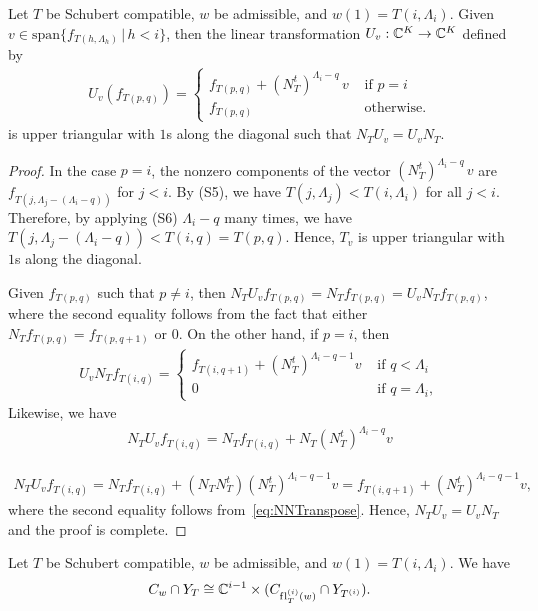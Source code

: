 \documentclass[12pt]{amsart}
\newcommand{\st}{\,|\,}
\newcommand{\vspan}{\mathrm{span}}
\newcommand{\fl}{\mathrm{f\hspace{0.25pt}l}}
\begin{document}
\begin{lemma}\label{lem:InvertibleTransf}
Let $T$ be Schubert compatible, $w$ be admissible, and $w(1) = T(i,\Lambda_i)$. Given $v\in \vspan\{f_{T(h,\Lambda_h)}\st h<i\}$, then the linear transformation $U_v: \mathbb{C}^K\to \mathbb{C}^K$ defined by
\begin{align}
    U_v(f_{T(p,q)}) = \begin{cases} f_{T(p,q)} + (N^t_T)^{\Lambda_i-q}\,v & \text{ if }p=i\\ f_{T(p,q)} & \text{ otherwise.}\end{cases}
\end{align}
is upper triangular with $1$s along the diagonal such that $N_TU_v = U_vN_T$.
\end{lemma}

\begin{proof}
In the case $p=i$, the nonzero components of the vector $(N_T^t)^{\Lambda_i-q}\,v$ are $f_{T(j,\Lambda_j-(\Lambda_i-q))}$ for $j<i$. By (S5), we have $T(j,\Lambda_j) < T(i,\Lambda_i)$ for all $j<i$. Therefore, by applying (S6) $\Lambda_i-q$ many times, we have $T(j,\Lambda_j-(\Lambda_i-q)) < T(i,q)=T(p,q)$. Hence, $T_v$ is upper triangular with $1$s along the diagonal.

Given $f_{T(p,q)}$ such that $p\neq i$, then $N_T U_v f_{T(p,q)} = N_T f_{T(p,q)} = U_v N_T f_{T(p,q)}$, where the second equality follows from the fact that either $N_T f_{T(p,q)} = f_{T(p,q+1)}$ or $0$. On the other hand, if $p=i$, then 
\begin{align}
    U_v N_T f_{T(i,q)} = \begin{cases} f_{T(i,q+1)} + (N_T^t)^{\Lambda_i-q-1}v & \text{ if } q<\Lambda_i\\  0 & \text{ if }q = \Lambda_i,\end{cases}
\end{align}
Likewise, we have
\begin{align}
    N_T U_v f_{T(i,q)} = N_T f_{T(i,q)} + N_T(N_T^t)^{\Lambda_i-q}v 
\end{align}

\begin{align}
    N_T U_v f_{T(i,q)} = N_T f_{T(i,q)} + (N_T N_T^t) (N_T^t)^{\Lambda_i-q-1}v = f_{T(i,q+1)} + (N_T^t)^{\Lambda_i-q-1}v,
\end{align}
where the second equality follows from~\eqref{eq:NNTranspose}. Hence, $N_TU_v = U_vN_T$ and the proof is complete.
\end{proof}


\begin{lemma}\label{lem:CellRecursion}
Let $T$ be Schubert compatible, $w$ be admissible, and $w(1)= T(i,\Lambda_i)$. We have 
\[C_w\cap Y_{T}\cong \mathbb{C}^{i-1}\times (C_{\fl_T^{(i)}(w)}\cap Y_{T^{(i)}}).\]
\end{lemma}
\end{document}
